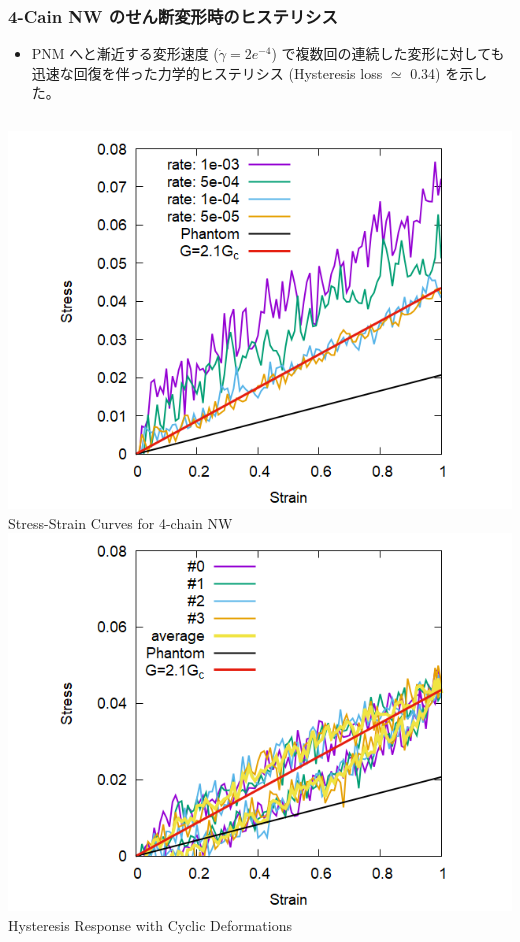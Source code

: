 \documentclass[12pt, dvipdfmx]{beamer}
\begin{document}
\begin{frame}
	\frametitle{4-Cain NW のせん断変形時のヒステリシス}
	\begin{itemize}
		\item PNM へと漸近する変形速度 ($\dot{\gamma} = 2e^{-4}$) で複数回の連続した変形に対しても迅速な回復を伴った力学的ヒステリシス (Hysteresis loss $\simeq$ 0.34) を示した。
	\end{itemize}

	\begin{columns}[totalwidth=\linewidth]
			\centering
				\includegraphics[width=\textwidth]{Shear_Random_4chain_N20.png}
				Stress-Strain Curves for 4-chain NW 
			\centering
				\includegraphics[width=\textwidth]{CyclicDeform_4chain_rate_2e-4.png}
				Hysteresis Response with Cyclic Deformations
		\end{columns}
\end{frame}
\end{document}
